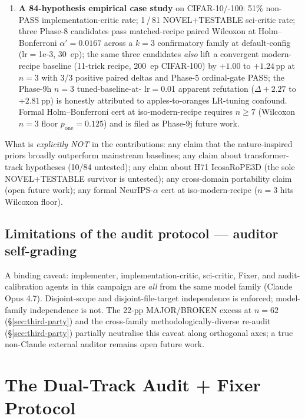 \documentclass{article}
\begin{document}
\begin{enumerate}
  \item \textbf{A 84-hypothesis empirical case study} on CIFAR-10/-100:
    51\% non-PASS implementation-critic rate; 1\,/\,81 NOVEL+TESTABLE
    sci-critic rate; three Phase-8 candidates pass matched-recipe
    paired Wilcoxon at Holm--Bonferroni $\alpha'{=}0.0167$ across a
    $k{=}3$ confirmatory family at default-config (lr$=$1e-3, 30~ep);
    the same three candidates \emph{also} lift a convergent modern-
    recipe baseline (11-trick recipe, 200~ep CIFAR-100) by ${+}1.00$
    to ${+}1.24$\,pp at $n{=}3$ with 3/3 positive paired deltas and
    Phase-5 ordinal-gate PASS; the Phase-9h $n{=}3$ tuned-baseline-at-
    lr$=$0.01 apparent refutation ($\Delta {+}2.27$ to ${+}2.81$\,pp)
    is honestly attributed to apples-to-oranges LR-tuning confound.
    Formal Holm--Bonferroni cert at iso-modern-recipe requires
    $n{\geq}7$ (Wilcoxon $n{=}3$ floor $p_{\mathrm{one}}{=}0.125$) and
    is filed as Phase-9j future work.
\end{enumerate}

What is \emph{explicitly NOT} in the contributions: any claim that the
nature-inspired priors broadly outperform mainstream baselines; any
claim about transformer-track hypotheses (10/84 untested); any claim
about H71 IcosaRoPE3D (the sole NOVEL+TESTABLE survivor is untested);
any cross-domain portability claim (open future work); any formal
NeurIPS-$\alpha$ cert at iso-modern-recipe ($n{=}3$ hits Wilcoxon
floor).

\subsection{Limitations of the audit protocol --- auditor self-grading}
\label{sec:self-grading}

A binding caveat: implementer, implementation-critic, sci-critic,
Fixer, and audit-calibration agents in this campaign are \emph{all}
from the same model family (Claude Opus 4.7). Disjoint-scope and
disjoint-file-target independence is enforced; model-family
independence is not. The 22-pp MAJOR/BROKEN excess at $n{=}62$
(\S\ref{sec:third-party}) and the cross-family methodologically-diverse
re-audit (\S\ref{sec:third-party}) partially neutralise this caveat
along orthogonal axes; a true non-Claude external auditor remains open
future work.

\section{The Dual-Track Audit + Fixer Protocol}
\label{sec:protocol}
\end{document}
